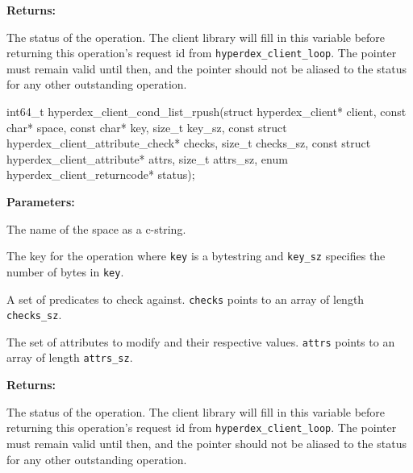 \noindent\textbf{Returns:}
\begin{description}[labelindent=\widthof{{\texttt{status}}},leftmargin=*,noitemsep,nolistsep,align=right]
\item[\texttt{status}] The status of the operation.  The client library will fill in this variable before returning this operation's request id from \texttt{hyperdex\_client\_loop}.  The pointer must remain valid until then, and the pointer should not be aliased to the status for any other outstanding operation.
\end{description}

\funcsep
{}
\begin{ccode}
int64_t hyperdex_client_cond_list_rpush(struct hyperdex_client* client,
                const char* space,
                const char* key, size_t key_sz,
                const struct hyperdex_client_attribute_check* checks, size_t checks_sz,
                const struct hyperdex_client_attribute* attrs, size_t attrs_sz,
                enum hyperdex_client_returncode* status);
\end{ccode}
\funcdesc 

\noindent\textbf{Parameters:}
\begin{description}[labelindent=\widthof{{\texttt{checks}, \texttt{checks\_sz}}},leftmargin=*,noitemsep,nolistsep,align=right]
\item[\texttt{space}] The name of the space as a c-string.
\item[\texttt{key}, \texttt{key\_sz}] The key for the operation where \texttt{key} is a bytestring and \texttt{key\_sz} specifies the number of bytes in \texttt{key}.
\item[\texttt{checks}, \texttt{checks\_sz}] A set of predicates to check against.  \texttt{checks} points to an array of length \texttt{checks\_sz}.
\item[\texttt{attrs}, \texttt{attrs\_sz}] The set of attributes to modify and their respective values.  \texttt{attrs} points to an array of length \texttt{attrs\_sz}.
\end{description}

\noindent\textbf{Returns:}
\begin{description}[labelindent=\widthof{{\texttt{status}}},leftmargin=*,noitemsep,nolistsep,align=right]
\item[\texttt{status}] The status of the operation.  The client library will fill in this variable before returning this operation's request id from \texttt{hyperdex\_client\_loop}.  The pointer must remain valid until then, and the pointer should not be aliased to the status for any other outstanding operation.
\end{description}

